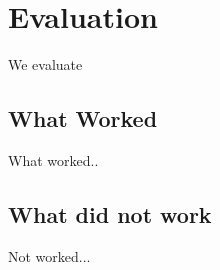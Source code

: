 \section{Evaluation}\label{sec:evaluation}

We evaluate 

\subsection{What Worked}
What worked..

\subsection{What did not work}
Not worked...

